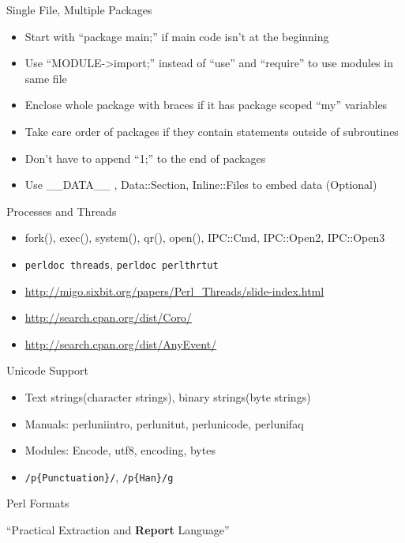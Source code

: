 \documentclass{beamer}
\begin{document}
\begin{frame}{Single File, Multiple Packages}
  \begin{itemize}
    \item   Start with ``package main;'' if main code isn't at the beginning
    \item   Use ``MODULE->import;'' instead of ``use'' and ``require'' to use modules in same file
    \item   Enclose whole package with braces if it has package scoped ``my'' variables
    \item   Take care order of packages if they contain statements outside of subroutines
    \item   Don't have to append ``1;'' to the end of packages
    \item   Use \_\_DATA\_\_ , Data::Section, Inline::Files to embed data (Optional)
  \end{itemize}
\end{frame}

\begin{frame}{Processes and Threads}
    \begin{itemize}
        \item   fork(), exec(), system(), qr(), open(), IPC::Cmd, IPC::Open2, IPC::Open3
        \item   \texttt{perldoc threads}, \texttt{perldoc perlthrtut}
        \item   \url{http://migo.sixbit.org/papers/Perl_Threads/slide-index.html}
        \item   \url{http://search.cpan.org/dist/Coro/}
        \item   \url{http://search.cpan.org/dist/AnyEvent/}
    \end{itemize}
\end{frame}

\begin{frame}{Unicode Support}
    \begin{itemize}
        \item   Text strings(character strings), binary strings(byte strings)
        \item   Manuals: perluniintro, perlunitut, perlunicode, perlunifaq
        \item   Modules: Encode, utf8, encoding, bytes
        \item   \texttt{/p\{Punctuation\}/}, \texttt{/p\{Han\}/g}
    \end{itemize}
\end{frame}

\begin{frame}{Perl Formats}
  \begin{center}
    ``Practical Extraction and {\bf Report} Language''
  \end{center}
\end{frame}
\end{document}
